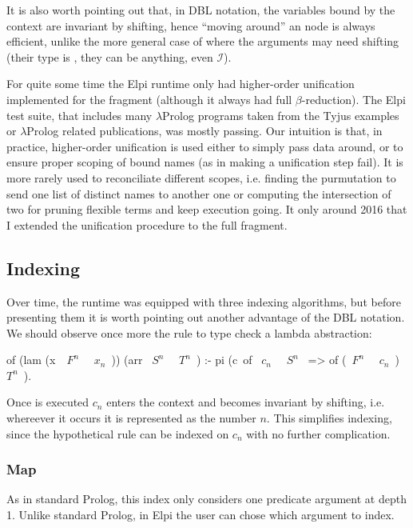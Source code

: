 \documentclass[a4paper, 11pt]{book}
\begin{document}
It is also worth pointing out that, in DBL notation, the variables
bound by the context are invariant by shifting, hence ``moving around'' an
 node is always efficient, unlike the more general case
of  where the arguments may need shifting (their type
is , they can be anything, even $\mathcal{I}$).

For quite some time the Elpi runtime only had higher-order unification
implemented for the \thefragment fragment (although it always had full
$\beta$-reduction). The Elpi test suite, that includes many
$\lambda$Prolog programs taken from the Tyjus examples or $\lambda$Prolog
related publications, was mostly passing. Our intuition
is that, in practice, higher-order unification is used either to simply
pass data around, or to ensure proper scoping of bound names (as in making
a unification step fail). It is more rarely used to reconciliate different
scopes, i.e. finding the purmutation to send one list of distinct names to
another one or computing the intersection of two for pruning flexible terms
and keep execution going.
It only around 2016 that I extended the unification procedure
to the full \theotherfragment fragment.

\subsection{Indexing}

Over time, the runtime was equipped with three indexing algorithms, but before
presenting them it is worth pointing out another advantage of the DBL notation.
We should observe once more the rule to type check a lambda abstraction:

\begin{elpicode}
of (lam (x\ ~$F^n$~ ~$x_n$~)) (arr ~$S^n$~ ~$T^n$~) :-
  pi (c\ of ~$c_n$~ ~$S^n$~ => of (~$F^n$~ ~$c_n$~) ~$T^n$~).
\end{elpicode}

\noindent
Once  is executed $c_n$ enters the context and becomes invariant
by shifting, i.e. whereever it occurs it is represented as the number $n$.
This simplifies indexing, since the hypothetical rule 
can be indexed on $c_n$ with no further complication.

\subsubsection{Map}

As in standard Prolog, this index only considers one predicate
argument at depth 1. Unlike standard Prolog, in Elpi the user can
chose which argument to index.
\end{document}
